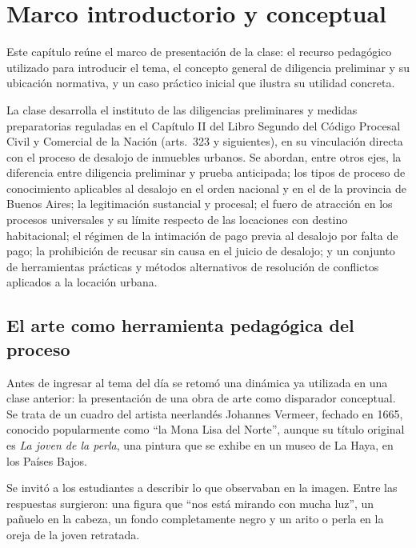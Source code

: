 \documentclass[12pt,oneside]{book}
\begin{document}
\tableofcontents


\chapter{Marco introductorio y conceptual}

Este capítulo reúne el marco de presentación de la clase: el recurso pedagógico utilizado para introducir el tema, el concepto general de diligencia preliminar y su ubicación normativa, y un caso práctico inicial que ilustra su utilidad concreta.

La clase desarrolla el instituto de las diligencias preliminares y medidas preparatorias reguladas en el Capítulo II del Libro Segundo del Código Procesal Civil y Comercial de la Nación (arts.\ 323 y siguientes), en su vinculación directa con el proceso de desalojo de inmuebles urbanos. Se abordan, entre otros ejes, la diferencia entre diligencia preliminar y prueba anticipada; los tipos de proceso de conocimiento aplicables al desalojo en el orden nacional y en el de la provincia de Buenos Aires; la legitimación sustancial y procesal; el fuero de atracción en los procesos universales y su límite respecto de las locaciones con destino habitacional; el régimen de la intimación de pago previa al desalojo por falta de pago; la prohibición de recusar sin causa en el juicio de desalojo; y un conjunto de herramientas prácticas y métodos alternativos de resolución de conflictos aplicados a la locación urbana.

\section{El arte como herramienta pedagógica del proceso}

Antes de ingresar al tema del día se retomó una dinámica ya utilizada en una clase anterior: la presentación de una obra de arte como disparador conceptual. Se trata de un cuadro del artista neerlandés Johannes Vermeer, fechado en 1665, conocido popularmente como ``la Mona Lisa del Norte'', aunque su título original es \textit{La joven de la perla}, una pintura que se exhibe en un museo de La Haya, en los Países Bajos.

Se invitó a los estudiantes a describir lo que observaban en la imagen. Entre las respuestas surgieron: una figura que ``nos está mirando con mucha luz'', un pañuelo en la cabeza, un fondo completamente negro y un arito o perla en la oreja de la joven retratada.
\end{document}
